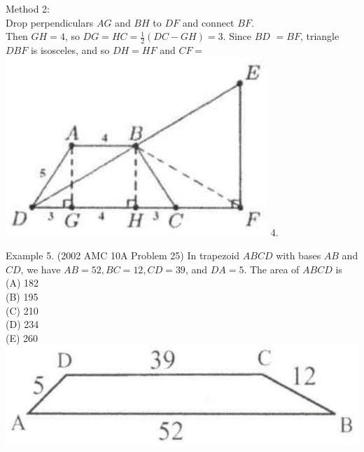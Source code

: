 \documentclass[10pt]{article}
\begin{document}
Method 2:\\
Drop perpendiculars \(A G\) and \(B H\) to \(D F\) and connect \(B F\).\\
Then \(G H=4\), so \(D G=H C=\frac{1}{2}(D C-G H)=3\). Since \(B D\) \(=B F\), triangle \(D B F\) is isosceles, and so \(D H=H F\) and \(C F=\)\\
\includegraphics[max width=\textwidth]{2025_04_17_97bc1f7e44d93c271a88g-077(2)} 4.

Example 5. (2002 AMC 10A Problem 25) In trapezoid \(A B C D\) with bases \(A B\) and \(C D\), we have \(A B=52, B C=12, C D=39\), and \(D A=5\). The area of \(A B C D\) is\\
(A) 182\\
(B) 195\\
(C) 210\\
(D) 234\\
(E) 260\\
\includegraphics[max width=\textwidth, center]{2025_04_17_97bc1f7e44d93c271a88g-077(1)}
\end{document}
